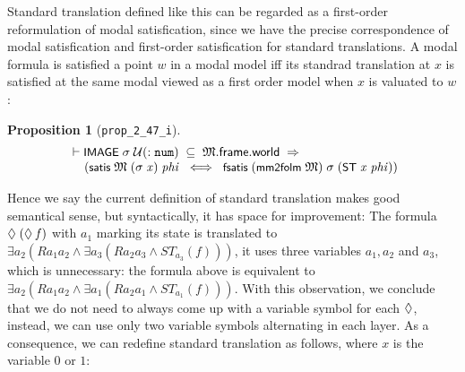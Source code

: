 \documentclass[letterpaper]{article}
\newtheorem{prop}{Proposition}
\renewcommand{\HOLConst}[1]{{\textsf{\upshape\small #1}}}
\renewcommand{\HOLinline}[1]{\ensuremath{#1}}
\newenvironment{holmath}{\begin{displaymath}\begin{array}{l}}{\end{array}\end{displaymath}\ignorespacesafterend}
\begin{document}
Standard translation defined like this can be regarded as a first-order reformulation of modal satisfication, since we have the precise correspondence of modal satisfication and first-order satisfication for standard translations. A modal formula is satisfied a point $w$ in a modal model iff its standrad translation at $x$ is satisfied at the same modal viewed as a first order model when $x$ is valuated to $w$:
\begin{prop}[\texttt{prop_2_47_i}]
\begin{holmath}
  \ensuremath{\HOLTokenTurnstile}\HOLConst{IMAGE}\;\HOLFreeVar{\ensuremath{\sigma}}\;\ensuremath{\cal{U}}(:\HOLTyOp{num})\;\HOLSymConst{\HOLTokenSubset{}}\;\HOLFreeVar{\ensuremath{\mathfrak{M}}}.\HOLFieldName{frame}.\HOLFieldName{world}\;\HOLSymConst{\HOLTokenImp{}}\\
\;\;\;\;\;(\HOLConst{satis}\;\HOLFreeVar{\ensuremath{\mathfrak{M}}}\;(\HOLFreeVar{\ensuremath{\sigma}}\;\HOLFreeVar{x})\;\HOLFreeVar{phi}\;\HOLSymConst{\HOLTokenEquiv{}}\;\HOLConst{fsatis}\;(\HOLConst{mm2folm}\;\HOLFreeVar{\ensuremath{\mathfrak{M}}})\;\HOLFreeVar{\ensuremath{\sigma}}\;(\HOLConst{ST}\;\HOLFreeVar{x}\;\HOLFreeVar{phi}))
\end{holmath}
\end{prop}
Hence we say the current definition of standard translation makes good semantical sense, but syntactically, it has space for improvement: The formula \HOLinline{\HOLSymConst{\ensuremath{\Diamond}}\;(\HOLSymConst{\ensuremath{\Diamond}}\;\HOLFreeVar{f})} with $a_1$ marking its state is translated to $\exists a_2(R a_1 a_2\land\exists a_3(Ra_2a_3 \land ST_{a_3}(f)))$, it uses three variables $a_1,a_2$ and $a_3$, which is unnecessary: the formula above is equivalent to $\exists a_2(R a_1 a_2\land\exists a_1(Ra_2a_1\land ST_{a_1}(f)))$. With this observation, we conclude that we do not need to always come up with a variable symbol for each \HOLinline{\HOLSymConst{\ensuremath{\Diamond}}}, instead, we can use only two variable symbols alternating in each layer. As a consequence, we can redefine standard translation as follows, where $x$ is the variable $0$ or $1$:
\end{document}
